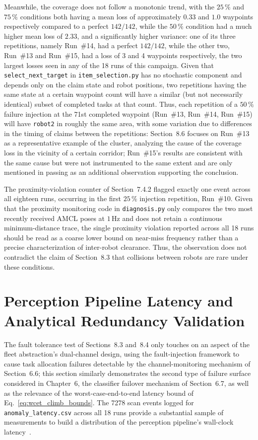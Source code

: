 Meanwhile, the coverage does not follow a monotonic trend, with the $25\,\%$ and $75\,\%$ conditions both having a mean loss of approximately $0.33$ and $1.0$ waypoints respectively compared to a perfect $142/142$, while the $50\,\%$ condition had a much higher mean loss of $2.33$, and a significantly higher variance: one of its three repetitions, namely Run~\#14, had a perfect $142/142$, while the other two, Run~\#13 and Run~\#15, had a loss of 3 and 4 waypoints respectively, the two largest losses seen in any of the 18 runs of this campaign. Given that \texttt{select\_next\_target} in \texttt{item\_selection.py} has no stochastic component and depends only on the claim state and robot positions, two repetitions having the same state at a certain waypoint count will have a similar (but not necessarily identical) subset of completed tasks at that count. Thus, each repetition of a $50\,\%$ failure injection at the 71st completed waypoint (Run~\#13, Run~\#14, Run~\#15) will have \texttt{robot2} in roughly the same area, with some variation due to differences in the timing of claims between the repetitions: Section~8.6 focuses on Run~\#13 as a representative example of the cluster, analyzing the cause of the coverage loss in the vicinity of a certain corridor; Run~\#15's results are consistent with the same cause but were not instrumented to the same extent and are only mentioned in passing as an additional observation supporting the conclusion.

The proximity-violation counter of Section~7.4.2 flagged exactly one event across all eighteen runs, occurring in the first $25\,\%$ injection repetition, Run~\#10. Given that the proximity monitoring code in \texttt{diagnosis.py} only compares the two most recently received AMCL poses at $1\,\text{Hz}$ and does not retain a continuous minimum-distance trace, the single proximity violation reported across all 18 runs should be read as a coarse lower bound on near-miss frequency rather than a precise characterization of inter-robot clearance. Thus, the observation does not contradict the claim of Section~8.3 that collisions between robots are rare under these conditions.

\section{Perception Pipeline Latency and Analytical Redundancy Validation}

The fault tolerance test of Sections~8.3 and~8.4 only touches on an aspect of the fleet abstraction's dual-channel design, using the fault-injection framework to cause task allocation failures detectable by the channel-monitoring mechanism of Section~6.6; this section similarly demonstrates the second type of failure surface considered in Chapter~6, the classifier failover mechanism of Section~6.7, as well as the relevance of the worst-case-end-to-end latency bound of Eq.~\eqref{eq:wcet_climb_bounds}. The 7278 scan events logged for \texttt{anomaly\_latency.csv} across all 18 runs provide a substantial sample of measurements to build a distribution of the perception pipeline's wall-clock latency~\cite{teper2024thread}.

